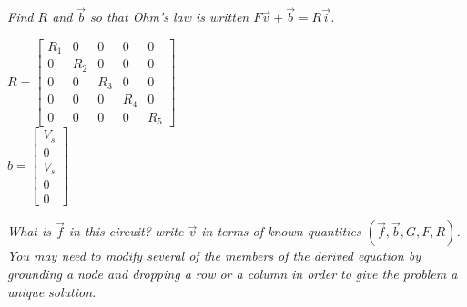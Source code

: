\documentclass[letter]{article}
\newenvironment{menumerate}{%
  \edef\backupindent{\the\parindent}%
  \enumerate%
  \setlength{\parindent}{\backupindent}%
}{\endenumerate}
\begin{document}
\begin{menumerate}
\begin{menumerate}
        \item \emph{Find $R$ and $\vec{b}$ so that Ohm’s law is written $F\vec{v} + \vec{b} = R\vec{i}$.}

        \begin{center}
        $R = \begin{bmatrix}
        R_1&0&0&0&0\\
        0&R_2&0&0&0\\
        0&0&R_3&0&0\\
        0&0&0&R_4&0\\
        0&0&0&0&R_5
        \end{bmatrix}$ \\
        $b = \begin{bmatrix}
        V_s\\0\\V_s\\0\\0
        \end{bmatrix}$
        \end{center}
        \item \emph{What is $\vec{f}$ in this circuit? write $\vec{v}$ in terms of known quantities $(\vec{f} , \vec{b}, G, F, R)$. You may need to modify several of the members of the derived equation by grounding a node and dropping a row or a column in order to give the problem a unique solution.}


\end{menumerate}
\end{menumerate}
\end{document}
